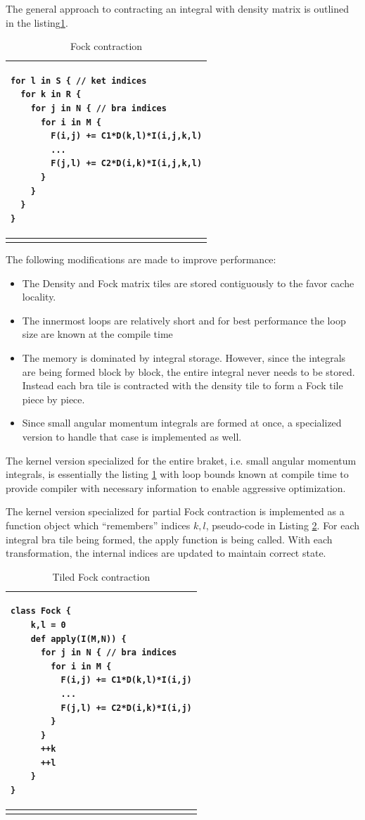 \documentclass[12pt]{article}
\begin{document}
The general approach to contracting an integral with density matrix is
outlined in the listing\ref {Fock1}.

\begin{table}
\begin{tabular}{ p{6in} }
\hline
\begin{verbatim}
for l in S { // ket indices
  for k in R {
    for j in N { // bra indices
      for i in M {
        F(i,j) += C1*D(k,l)*I(i,j,k,l)
        ...
        F(j,l) += C2*D(i,k)*I(i,j,k,l)
      }
    }
  }
}
\end{verbatim} \\
\hline

\label{Fock1}
\caption{Fock contraction}
\end{tabular}
\end{table}


The following modifications are made to improve performance:
   
\begin{itemize}
 \item The Density and Fock matrix tiles are stored contiguously to
   the favor cache locality.
\item The innermost loops are relatively short and for best
  performance the loop size are known at the compile time
\item The memory is dominated by integral storage.  However, since the
  integrals are being formed block by block, the entire integral never
  needs to be stored. Instead each bra tile is contracted with the
  density tile to form a Fock tile piece by piece.
\item Since small angular momentum integrals are formed at once, a
  specialized version to handle that case is implemented as well.
\end{itemize}

The kernel version specialized for the entire braket, i.e. small
angular momentum integrals, is essentially the listing \ref{Fock1} with
loop bounds known at compile time to provide compiler with necessary
information to enable aggressive optimization.

The kernel version specialized for partial Fock contraction is
implemented as a function object which ``remembers'' indices $k,l$,
pseudo-code in Listing \ref{Fock2}.  For each integral bra tile being
formed, the apply function is being called. With each transformation,
the internal indices are updated to maintain correct state.

\begin{table}
\begin{tabular}{ p{6in} }
\hline
\begin{verbatim}
class Fock {
    k,l = 0
    def apply(I(M,N)) {
      for j in N { // bra indices
        for i in M {
          F(i,j) += C1*D(k,l)*I(i,j)
          ...
          F(j,l) += C2*D(i,k)*I(i,j)
        }
      }
      ++k
      ++l
    }
}
\end{verbatim} \\
\hline

\label{Fock2}
\caption{Tiled Fock contraction}
\end{tabular}
\end{table}
\end{document}
